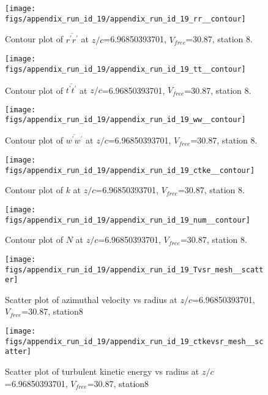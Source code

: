 \begin{figure}[H]
\centering
\texttt{[image: figs/appendix\_run\_id\_19/appendix\_run\_id\_19\_rr\_\_contour]}
\caption{Contour plot of $\overline{r^\prime r^\prime}$ at $z/c$=6.96850393701, $V_{free}$=30.87, station 8.}
\label{fig:appendix_run_id_19_rr__contour}
\end{figure}


\begin{figure}[H]
\centering
\texttt{[image: figs/appendix\_run\_id\_19/appendix\_run\_id\_19\_tt\_\_contour]}
\caption{Contour plot of $\overline{t^\prime t^\prime}$ at $z/c$=6.96850393701, $V_{free}$=30.87, station 8.}
\label{fig:appendix_run_id_19_tt__contour}
\end{figure}


\begin{figure}[H]
\centering
\texttt{[image: figs/appendix\_run\_id\_19/appendix\_run\_id\_19\_ww\_\_contour]}
\caption{Contour plot of $\overline{w^\prime w^\prime}$ at $z/c$=6.96850393701, $V_{free}$=30.87, station 8.}
\label{fig:appendix_run_id_19_ww__contour}
\end{figure}


\begin{figure}[H]
\centering
\texttt{[image: figs/appendix\_run\_id\_19/appendix\_run\_id\_19\_ctke\_\_contour]}
\caption{Contour plot of $k$ at $z/c$=6.96850393701, $V_{free}$=30.87, station 8.}
\label{fig:appendix_run_id_19_ctke__contour}
\end{figure}


\begin{figure}[H]
\centering
\texttt{[image: figs/appendix\_run\_id\_19/appendix\_run\_id\_19\_num\_\_contour]}
\caption{Contour plot of $N$ at $z/c$=6.96850393701, $V_{free}$=30.87, station 8.}
\label{fig:appendix_run_id_19_num__contour}
\end{figure}


\begin{figure}[H]
\centering
\texttt{[image: figs/appendix\_run\_id\_19/appendix\_run\_id\_19\_Tvsr\_mesh\_\_scatter]}
\caption{Scatter plot of azimuthal velocity vs radius at $z/c$=6.96850393701, $V_{free}$=30.87, station8}
\label{fig:appendix_run_id_19_Tvsr_mesh__scatter}
\end{figure}


\begin{figure}[H]
\centering
\texttt{[image: figs/appendix\_run\_id\_19/appendix\_run\_id\_19\_ctkevsr\_mesh\_\_scatter]}
\caption{Scatter plot of turbulent kinetic energy vs radius at $z/c$=6.96850393701, $V_{free}$=30.87, station8}
\label{fig:appendix_run_id_19_ctkevsr_mesh__scatter}
\end{figure}


